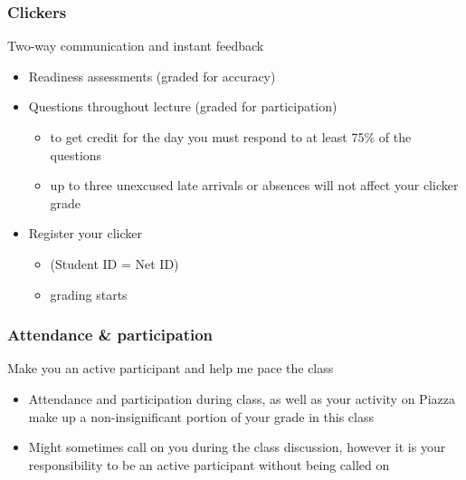 \documentclass[slidestop,compress,mathserif,12pt,t,professionalfonts,xcolor=table]{beamer}
\begin{document}
\begin{frame}
\frametitle{Clickers}

 Two-way communication and instant feedback

\begin{itemize}
\item Readiness assessments (graded for accuracy)

\item Questions throughout lecture (graded for participation)
\begin{itemize}
\item to get credit for the day you must respond to at least 75\% of the questions
\item up to three unexcused late arrivals or absences will not affect your clicker grade
\end{itemize}

\item Register your clicker
\begin{itemize}
\item {} (Student ID = Net ID)
\item grading starts \ClickerRegistrationDD{}
\end{itemize}

\end{itemize}


\end{frame}


\begin{frame}
\frametitle{Attendance \& participation}

 Make you an active participant and help me pace the class 

\begin{itemize}

\item Attendance and participation during class, as well as your activity on Piazza make up a non-insignificant portion of your grade in this class

\item Might sometimes call on you during the class discussion, however it is your responsibility to be an active participant without being called on

\end{itemize}


\end{frame}
\end{document}
